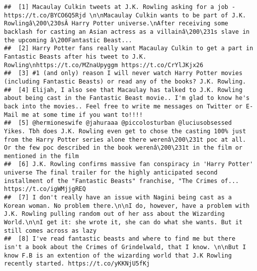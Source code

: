 \documentclass[]{article}
\begin{document}
\begin{verbatim}
##  [1] Macaulay Culkin tweets at J.K. Rowling asking for a job - https://t.co/BYCO6Q5Rjd \n\nMacaulay Culkin wants to be part of J.K. Rowlingâ\200\230sÂ Harry Potter universe.\nAfter receiving some backlash for casting an Asian actress as a villainâ\200\231s slave in the upcoming â\200Fantastic Beast...                                                           
##  [2] Harry Potter fans really want Macaulay Culkin to get a part in Fantastic Beasts after his tweet to J.K. Rowling\nhttps://t.co/MZnaUpyggm https://t.co/CrYlJKjx26                                                                                                                                                                                      
##  [3] #1 (and only) reason I will never watch Harry Potter movies (including Fantastic Beasts) or read any of the books? J.K. Rowling.                                                                                                                                                                                                                      
##  [4] Elijah, I also see that Macaulay has talked to J.K. Rowling about being cast in the Fantastic Beast movie.. I'm glad to know he's back into the movies.. Feel free to write me messages on Twitter or E-Mail me at some time if you want to!!!!                                                                                                       
##  [5] @hermioneswife @jahuraaa @piccolosturban @luciusobsessed Yikes. Tbh does J.K. Rowling even get to chose the casting 100% just from the Harry Potter series alone there werenâ\200\231t poc at all. Or the few poc described in the book werenâ\200\231t in the film or mentioned in the film                                                                      
##  [6] J.K. Rowling confirms massive fan conspiracy in 'Harry Potter' universe The final trailer for the highly anticipated second installment of the "Fantastic Beasts" franchise, "The Crimes of... https://t.co/igWMjjgREQ                                                                                                                                
##  [7] I don't really have an issue with Nagini being cast as a Korean woman. No problem there.\n\nI do, however, have a problem with J.K. Rowling pulling random out of her ass about the Wizarding World.\n\nI get it: she wrote it, she can do what she wants. But it still comes across as lazy                                                          
##  [8] I've read fantastic beasts and where to find me but there isn't a book about the Crimes of Grindelwald, that I know. \n\nBut I know F.B is an extention of the wizarding world that J.K Rowling recently started. https://t.co/yKKNjU5fKj                                                                                                             

\end{verbatim}
\end{document}
